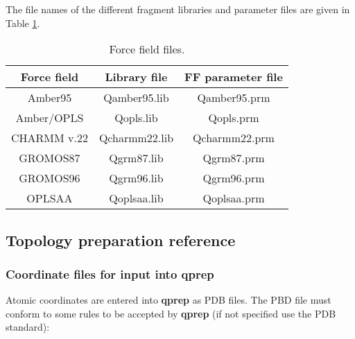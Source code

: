 \documentclass[a4paper,10pt]{article}
\begin{document}



The file names of the different fragment libraries and parameter
files are given in Table \ref{tab:ff_files}.

\begin{table}[htbp]
\begin{center}
\caption{Force field files.}
\label{tab:ff_files}
\small
\begin{tabular}{|c|c|c|}
\hline \textbf{Force field} & \textbf{Library file} & \textbf{FF parameter file} \\
\hline Amber95              & Qamber95.lib          & Qamber95.prm \\
\hline Amber/OPLS           & Qopls.lib             & Qopls.prm \\
\hline CHARMM v.22          & Qcharmm22.lib         & Qcharmm22.prm \\
\hline GROMOS87             & Qgrm87.lib            & Qgrm87.prm \\
\hline GROMOS96             & Qgrm96.lib            & Qgrm96.prm \\
\hline OPLSAA               & Qoplsaa.lib           & Qoplsaa.prm \\
\hline
\end{tabular}
\normalsize
\end{center}
\end{table}


\subsection{Topology preparation reference}\label{subsec:top_prep_ref}
\subsubsection{Coordinate files for input into \textbf{qprep}}
Atomic coordinates are entered into \textbf{qprep} as PDB files. The PBD
file must conform to some rules to be accepted by \textbf{qprep} (if not
specified use the PDB standard):
\end{document}

